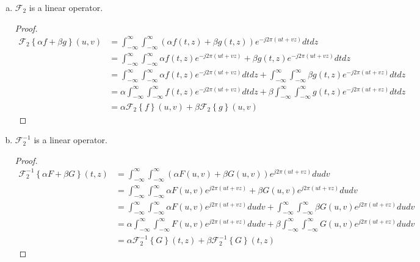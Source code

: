 \documentclass{paper}
\begin{document}
\begin{enumerate}[(a)] 


\item $\mathcal{F}_2$ is a linear operator. 
\begin{proof}
\begin{align*}
    \mathcal{F}_2 \left \{\alpha f + \beta g \right\}(u,v) 
    &= \int_{-\infty}^{\infty} \int_{-\infty}^{\infty} ( \alpha f(t,z) + \beta g(t,z) ) e^{-j 2 \pi (ut+vz)} dt dz \\
    &= \int_{-\infty}^{\infty} \int_{-\infty}^{\infty} \alpha f(t,z) e^{-j 2 \pi (ut+vz)} + \beta g(t,z) e^{-j 2 \pi (ut+vz)} dt dz \\
    &= \int_{-\infty}^{\infty} \int_{-\infty}^{\infty} \alpha f(t,z) e^{-j 2 \pi (ut+vz)} dt dz + \int_{-\infty}^{\infty} \int_{-\infty}^{\infty} \beta g(t,z) e^{-j 2 \pi (ut+vz)} dt dz \\
    &= \alpha \int_{-\infty}^{\infty} \int_{-\infty}^{\infty}  f(t,z) e^{-j 2 \pi (ut+vz)} dt dz + \beta \int_{-\infty}^{\infty} \int_{-\infty}^{\infty} g(t,z) e^{-j 2 \pi (ut+vz)} dt dz \\
    &= \alpha \mathcal{F}_2 \left \{f\right\}(u,v) + \beta \mathcal{F}_2 \left \{g \right\}(u,v)  
\end{align*}
\end{proof}

\item $\mathcal{F}^{-1}_2$ is a linear operator. 
\begin{proof}
\begin{align*}
    \mathcal{F}^{-1}_2 \left \{\alpha F + \beta G \right\}(t,z) 
    &= \int_{-\infty}^{\infty} \int_{-\infty}^{\infty} ( \alpha F(u,v) + \beta G(u,v) ) e^{j 2 \pi (ut+vz)} du dv \\
    &= \int_{-\infty}^{\infty} \int_{-\infty}^{\infty} \alpha F(u,v) e^{j 2 \pi (ut+vz)} + \beta G(u,v) e^{j 2 \pi (ut+vz)} du dv \\
    &= \int_{-\infty}^{\infty} \int_{-\infty}^{\infty} \alpha F(u,v) e^{j 2 \pi (ut+vz)} du dv + \int_{-\infty}^{\infty} \int_{-\infty}^{\infty} \beta G(u,v) e^{j 2 \pi (ut+vz)} du dv \\
    &= \alpha \int_{-\infty}^{\infty} \int_{-\infty}^{\infty} F(u,v) e^{j 2 \pi (ut+vz)} du dv + \beta \int_{-\infty}^{\infty} \int_{-\infty}^{\infty} G(u,v) e^{j 2 \pi (ut+vz)} du dv \\
    &= \alpha \mathcal{F}^{-1}_2 \left \{G\right\}(t,z) + \beta \mathcal{F}^{-1}_2 \left \{G \right\}(t,z)  
\end{align*}
\end{proof}
\end{enumerate} 
\end{document}
